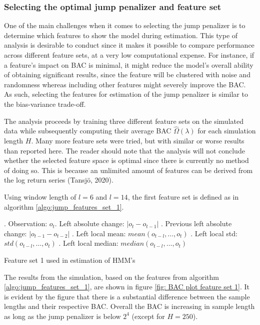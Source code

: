 \subsubsection{Selecting the optimal jump penalizer and feature set}
\label{subsubsection: optimal jump penalizer}
One of the main challenges when it comes to selecting the jump penalizer is to determine which features to show the model during estimation. This type of analysis is desirable to conduct since it makes it possible to compare performance across different feature sets, at a very low computational expense. For instance, if a feature's impact on BAC is minimal, it might reduce the model's overall ability of obtaining significant results, since the feature will be clustered with noise and randomness whereas including other features might severely improve the BAC. As such, selecting the features for estimation of the jump penalizer is similar to the bias-variance trade-off.  

The analysis proceeds by training three different feature sets on the simulated data while subsequently computing their average BAC  $\hat\Omega(\lambda)$ for each simulation length $H$. Many more feature sets were tried, but with similar or worse results than reported here. The reader should note that the analysis will not conclude whether the selected feature space is optimal since there is currently no method of doing so. This is because an unlimited amount of features can be derived from the log return series (Tansjö, 2020). 

Using window length of $l = 6$ and $l = 14$, the first feature set is defined as in algorithm \ref{algo:jump_features_set_1}. 

\begin{algorithm}[H]
. Observation: $o_t$. Left absolute change: $|o_t-o_{t-1}|$ . Previous left absolute change: $|o_{t-1}-o_{t-2}|$ . Left local mean: $mean(o_{t-l},\ldots,o_{t})$ . Left local std: $std(o_{t-l},\ldots, o_{t})$ . Left local median: $median(o_{t-l},\ldots,o_{t})$ \;
\BlankLine

\caption{Feature set 1 used in \jump estimation of HMM's}
\label{algo:jump_features_set_1}
\end{algorithm}

The results from the simulation, based on the features from algorithm \ref{algo:jump_features_set_1}, are shown in figure \ref{fig: BAC plot feature set 1}. It is evident by the figure that there is a substantial difference between the sample lengths and their respective BAC. Overall the BAC is increasing in sample length as long as the jump penalizer is below $2^4$ (except for $H=250$).


